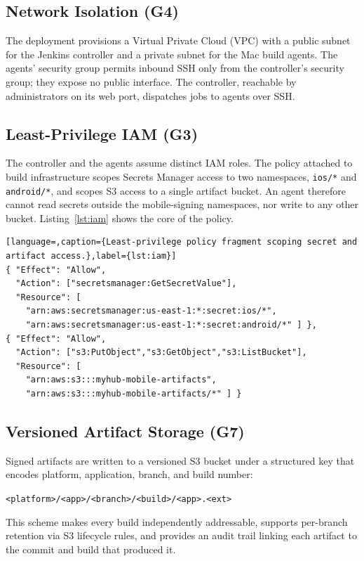 \documentclass[conference]{IEEEtran}
\begin{document}
\subsection{Network Isolation (G4)}
The deployment provisions a Virtual Private Cloud (VPC) with a public subnet for
the Jenkins controller and a private subnet for the Mac build agents. The
agents' security group permits inbound SSH only from the controller's security
group; they expose no public interface. The controller, reachable by
administrators on its web port, dispatches jobs to agents over SSH.

\subsection{Least-Privilege IAM (G3)}
The controller and the agents assume distinct IAM roles. The policy attached to
build infrastructure scopes Secrets Manager access to two namespaces,
\texttt{ios/*} and \texttt{android/*}, and scopes S3 access to a single artifact
bucket. An agent therefore cannot read secrets outside the mobile-signing
namespaces, nor write to any other bucket. Listing~\ref{lst:iam} shows the core
of the policy.

\begin{lstlisting}[language=,caption={Least-privilege policy fragment scoping secret and artifact access.},label={lst:iam}]
{ "Effect": "Allow",
  "Action": ["secretsmanager:GetSecretValue"],
  "Resource": [
    "arn:aws:secretsmanager:us-east-1:*:secret:ios/*",
    "arn:aws:secretsmanager:us-east-1:*:secret:android/*" ] },
{ "Effect": "Allow",
  "Action": ["s3:PutObject","s3:GetObject","s3:ListBucket"],
  "Resource": [
    "arn:aws:s3:::myhub-mobile-artifacts",
    "arn:aws:s3:::myhub-mobile-artifacts/*" ] }
\end{lstlisting}

\subsection{Versioned Artifact Storage (G7)}
Signed artifacts are written to a versioned S3 bucket under a structured key that
encodes platform, application, branch, and build number:
\begin{center}
\texttt{<platform>/<app>/<branch>/<build>/<app>.<ext>}
\end{center}
This scheme makes every build independently addressable, supports per-branch
retention via S3 lifecycle rules, and provides an audit trail linking each
artifact to the commit and build that produced it.
\end{document}
